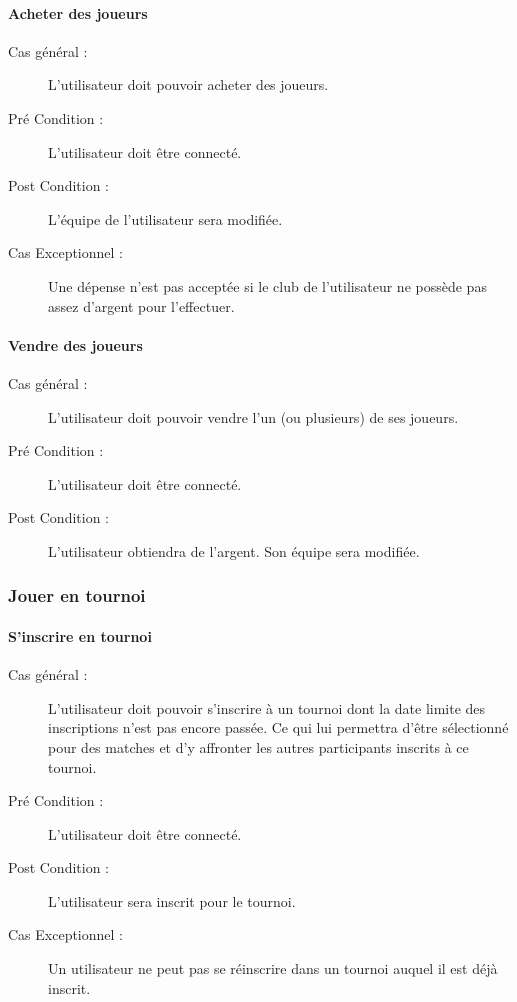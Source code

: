 \documentclass[a4paper]{article}
\begin{document}
\paragraph{Acheter des joueurs}
\begin{description}
\item[Cas général :] L'\gls{utilisateur} doit pouvoir acheter des joueurs.
\item[Pré Condition  :] L'\gls{utilisateur} doit être connecté.
\item[Post Condition :] L'équipe de l'utilisateur sera modifiée.
\item[Cas Exceptionnel :] Une dépense n'est pas acceptée si le \gls{club} de l'\gls{utilisateur} ne possède pas assez d'argent pour l'effectuer.
\end{description}
\paragraph{Vendre des joueurs}
\begin{description}
\item[Cas général :] L'\gls{utilisateur} doit pouvoir vendre l'un (ou plusieurs) de ses joueurs.
\item[Pré Condition  :] L'\gls{utilisateur} doit être connecté.
\item[Post Condition :] L'utilisateur obtiendra de l'argent. Son équipe sera modifiée.
\end{description}

\subsubsection{Jouer en tournoi}
\paragraph{S'inscrire en tournoi}
\begin{description}
\item[Cas général :] L'\gls{utilisateur} doit pouvoir s'inscrire à un tournoi dont la date limite des inscriptions n'est pas encore passée.
Ce qui lui permettra d'être sélectionné pour des matches et d'y affronter les autres participants inscrits à ce tournoi.
\item[Pré Condition  :] L'\gls{utilisateur} doit être connecté.
\item[Post Condition :] L'utilisateur sera inscrit pour le tournoi.
\item[Cas Exceptionnel :] Un \gls{utilisateur} ne peut pas se réinscrire dans un tournoi auquel il est déjà inscrit.
\end{description} 
\end{document}
